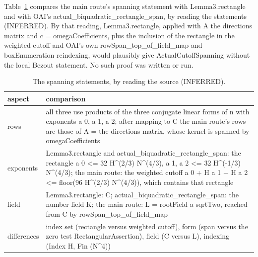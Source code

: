 Table~\ref{tab:spanning} compares the main route's spanning statement with Lemma3.rectangle and with OAI's actual\_biquadratic\_rectangle\_span, by reading the statements (INFERRED).
By that reading, Lemma3.rectangle, applied with A the directions matrix and c = omegaCoefficients, plus the inclusion of the rectangle in the weighted cutoff and OAI's own rowSpan\_top\_of\_field\_map and boxEnumeration reindexing, would plausibly give ActualCutoffSpanning without the local Bezout statement.
No such proof was written or run.

\begin{table}[tbp]
\caption{The spanning statements, by reading the source (INFERRED).}\label{tab:spanning}
\small
\begin{tabularx}{\textwidth}{@{}l>{\raggedright\arraybackslash}X@{}}
\toprule
aspect & comparison \\
\midrule
rows & all three use products of the three conjugate linear forms of n with exponents a 0, a 1, a 2; after mapping to C the main route's rows are those of A = the directions matrix, whose kernel is spanned by omegaCoefficients \\
exponents & Lemma3.rectangle and actual\_biquadratic\_rectangle\_span: the rectangle a 0 <= 32 H\textasciicircum(2/3) N\textasciicircum(4/3), a 1, a 2 <= 32 H\textasciicircum(-1/3) N\textasciicircum(4/3); the main route: the weighted cutoff a 0 + H a 1 + H a 2 <= floor(96 H\textasciicircum(2/3) N\textasciicircum(4/3)), which contains that rectangle \\
field & Lemma3.rectangle: C; actual\_biquadratic\_rectangle\_span: the number field K; the main route: L = rootField a sqrtTwo, reached from C by rowSpan\_top\_of\_field\_map \\
differences & index set (rectangle versus weighted cutoff), form (span versus the zero test RectangularAssertion), field (C versus L), indexing (Index H, Fin (N\textasciicircum4)) \\
\bottomrule
\end{tabularx}
\end{table}
